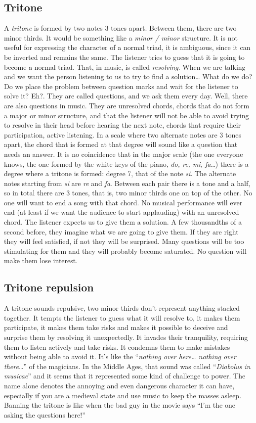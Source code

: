 \documentclass[]{report}
\begin{document}
\subsection{Tritone}
A \emph{tritone} is formed by two notes 3 tones apart. Between them, there are two minor thirds. It would be something like a \emph{minor / minor} structure. It is not useful for expressing the character of a normal triad, it is ambiguous, since it can be inverted and remains the same. The listener tries to guess that it is going to become a normal triad. That, in music, is called \emph{resolving}.
When we are talking and we want the person listening to us to try to find a solution\ldots{} What do we do? Do we place the problem between question marks and wait for the listener to solve it? Eh?. They are called questions, and we ask them every day.
Well, there are also questions in music. They are unresolved chords, chords that do not form a major or minor structure, and that the listener will not be able to avoid trying to resolve in their head before hearing the next note, chords that require their participation, active listening.
In a scale where two alternate notes are 3 tones apart, the chord that is formed at that degree will sound like a question that needs an answer. It is no coincidence that in the major scale (the one everyone knows, the one formed by the white keys of the piano, \emph{do, re, mi, fa}\ldots) there is a degree where a tritone is formed: degree 7, that of the note \emph{si}. The alternate notes starting from \emph{si} are \emph{re} and \emph{fa}. Between each pair there is a tone and a half, so in total there are 3 tones, that is, two minor thirds one on top of the other. No one will want to end a song with that chord.
No musical performance will ever end (at least if we want the audience to start applauding) with an unresolved chord. The listener expects us to give them a solution. A few thousandths of a second before, they imagine what we are going to give them. If they are right they will feel satisfied, if not they will be surprised. Many questions will be too stimulating for them and they will probably become saturated. No question will make them lose interest.
\subsection{Tritone repulsion}
A tritone sounds repulsive, two minor thirds don't represent anything stacked together.
It tempts the listener to guess what it will resolve to, it makes them participate, it makes them take risks and makes it possible to deceive and surprise them by resolving it unexpectedly.
It invades their tranquility, requiring them to listen actively and take risks. It condemns them to make mistakes without being able to avoid it. It's like the ``\emph{nothing over here\ldots{} nothing over there}\ldots{}'' of the magicians.
In the Middle Ages, that sound was called ``\emph{Diabolus in musicae}'' and it seems that it represented some kind of challenge to power. The name alone denotes the annoying and even dangerous character it can have, especially if you are a medieval state and use music to keep the masses asleep. Banning the tritone is like when the bad guy in the movie says ``I'm the one asking the questions here!''
\end{document}
